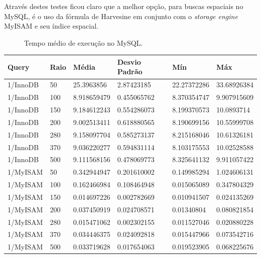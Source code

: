 \documentclass[diss]{template/setrem}
\begin{document}
Através destes testes ficou claro que a melhor opção, para buscas espaciais no MySQL, é o uso da fórmula de Harvesine em conjunto com o \emph{storage engine} MyISAM e seu índice espacial.

\begin{figure}[!h]
    
    \caption{Tempo médio de execução no MySQL.}
    \label{fig:test-mysql}
\end{figure}



\begin{table}
  \begin{center}
  	\footnotesize
  	\renewcommand{\arraystretch}{1.5}
    \begin{tabular}{ | l | l | l | l | l | l |}
    \hline
	\textbf{Query} & \textbf{Raio} & \textbf{Média} & \textbf{Desvio Padrão} & \textbf{Mín} & \textbf{Máx} \\ \hline
	1/InnoDB & 50  & 25.3963856  & 2.87423185  & 22.27372286 & 33.68926384 \\ \hline
	1/InnoDB & 100 & 8.918659479 & 0.455065762 & 8.370354747 & 9.907915609 \\ \hline
	1/InnoDB & 150 & 9.184612243 & 0.554286073 & 8.199370573 & 10.0893714  \\ \hline
	1/InnoDB & 200 & 9.002513411 & 0.618880565 & 8.190699156 & 10.55999708 \\ \hline
	1/InnoDB & 280 & 9.158097704 & 0.585273137 & 8.215168046 & 10.61326181 \\ \hline
	1/InnoDB & 370 & 9.036220277 & 0.594831114 & 8.103175553 & 10.02528588 \\ \hline
	1/InnoDB & 500 & 9.111568156 & 0.478069773 & 8.325641132 & 9.911057422 \\ \hline
	1/MyISAM & 50  & 0.342944947 & 0.201610002 & 0.149985294 & 1.024606131 \\ \hline
	1/MyISAM & 100 & 0.162466984 & 0.108464948 & 0.015065089 & 0.347804329 \\ \hline
	1/MyISAM & 150 & 0.014697226 & 0.002782669 & 0.010941507 & 0.024135269 \\ \hline
	1/MyISAM & 200 & 0.037450919 & 0.024708571 & 0.01340804  & 0.080821854 \\ \hline
	1/MyISAM & 280 & 0.015471062 & 0.002302155 & 0.011527046 & 0.020880228 \\ \hline
	1/MyISAM & 370 & 0.034446375 & 0.024092818 & 0.015447966 & 0.073542716 \\ \hline
	1/MyISAM & 500 & 0.033719628 & 0.017654063 & 0.019523905 & 0.068225676 \\ \hline

\end{tabular}
\end{center}
\end{table}
\end{document}
